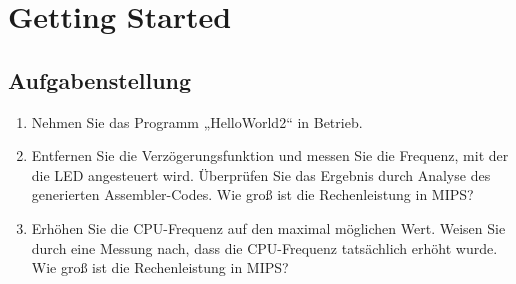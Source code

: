 \section{Getting Started}
\subsection{Aufgabenstellung}

\begin{enumerate}%
		\item Nehmen Sie das Programm „HelloWorld2“ in Betrieb.
		\item Entfernen Sie die Verzögerungsfunktion und messen Sie die Frequenz, mit der die LED angesteuert wird. Überprüfen Sie das Ergebnis durch Analyse des generierten Assembler-Codes. Wie groß ist die Rechenleistung in MIPS?
		
		\item Erhöhen Sie die CPU-Frequenz auf den maximal möglichen Wert. Weisen Sie durch eine Messung nach, dass die CPU-Frequenz tatsächlich erhöht wurde. Wie groß ist die Rechenleistung in MIPS?
\end{enumerate}


